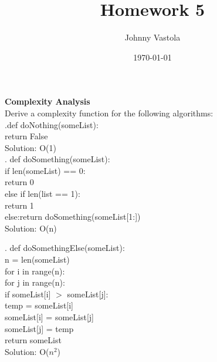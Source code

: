\documentclass[12pt]{article}
\title{Homework 5}
\author{Johnny Vastola}
\date{\today}
\begin{document}
\maketitle



\textbf{Complexity Analysis}\\
\indent Derive a complexity function for the following algorithms:\\

.\indent def doNothing(someList):\\
\indent \indent \indent return False\\
\indent Solution: O(1)\\

. \indent def doSomething(someList):\\
\indent \indent \indent if len(someList) == 0:\\
\indent \indent \indent \indent return 0\\
\indent \indent \indent else if len(list == 1):\\
\indent \indent \indent \indent return 1\\
\indent \indent \indent else:return doSomething(someList[1:]) \\
\indent Solution: O(n)

. \indent def doSomethingElse(someList):\\
\indent \indent \indent n = len(someList)\\
\indent \indent \indent for i in range(n):\\
\indent \indent \indent \indent for j in range(n):\\
\indent \indent  \indent \indent \indent if someList[i] $>$ someList[j]:\\
\indent \indent  \indent \indent \indent \indent temp = someList[i]\\
\indent \indent\indent\indent \indent \indent someList[i] = someList[j]\\
\indent \indent \indent \indent \indent\indent someList[j] = temp\\
\indent \indent  \indent return someList\\
\indent Solution: O($n^2$)\\
\end{document}
